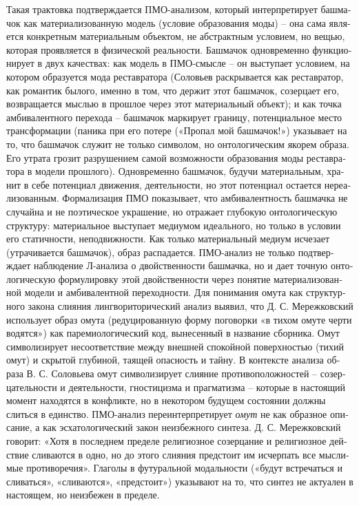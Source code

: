 \begin{russian}
    Такая трактовка подтверждается ПМО-анализом, который  интерпретирует башмачок как материализованную модель (условие образования моды) – она сама является конкретным материальным объектом, не абстрактным условием, но вещью, которая проявляется в физической реальности. Башмачок одновременно функционирует в двух качествах: как модель в ПМО-смысле – он выступает условием, на котором образуется мода реставратора (Соловьев раскрывается как реставратор, как романтик былого, именно в том, что держит этот башмачок, созерцает его, возвращается мыслью в прошлое через этот материальный объект); и как точка амбивалентного перехода – башмачок маркирует границу, потенциальное место трансформации (паника при его потере («Пропал мой башмачок!») указывает на то, что башмачок служит не только символом, но онтологическим якорем образа. Его утрата грозит разрушением самой возможности образования моды реставратора в модели прошлого). Одновременно башмачок, будучи материальным, хранит в себе потенциал движения, деятельности, но этот потенциал остается нереализованным.
    Формализация ПМО показывает, что амбивалентность башмачка не случайна и не поэтическое украшение, но отражает глубокую онтологическую структуру: материальное выступает медиумом идеального, но только в условии его статичности, неподвижности. Как только материальный медиум исчезает (утрачивается башмачок), образ распадается.
    ПМО-анализ не только подтверждает наблюдение Л-анализа о двойственности башмачка, но и дает точную онтологическую формулировку этой двойственности через понятие материализованной модели и амбивалентной переходности.
    Для понимания омута как структурного закона слияния лингвориторический анализ выявил, что Д. С. Мережковский использует образ омута (редуцированную форму поговорки «в тихом омуте черти водятся») как паремиологический код, вынесенный в название сборника. Омут символизирует несоответствие между внешней спокойной поверхностью (тихий омут) и скрытой глубиной, таящей опасность и тайну. В контексте анализа образа В. С. Соловьева омут символизирует слияние противоположностей – созерцательности и деятельности, гностицизма и прагматизма – которые в настоящий момент находятся в конфликте, но в некотором будущем состоянии должны слиться в единство.
    ПМО-анализ переинтерпретирует \textit{омут} не как образное описание, а как эсхатологический закон неизбежного синтеза. Д. С. Мережковский говорит: «Хотя в последнем пределе религиозное созерцание и религиозное действие сливаются в одно, но до этого слияния предстоит им исчерпать все мыслимые противоречия». Глаголы в футуральной модальности («будут встречаться и сливаться», «сливаются», «предстоит») указывают на то, что синтез не актуален в настоящем, но неизбежен в пределе.

\end{russian}
